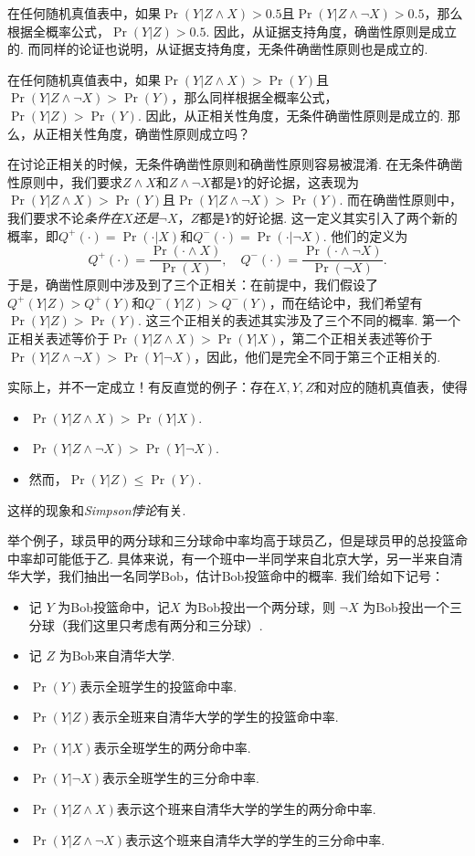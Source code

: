 在任何随机真值表中，如果$\Pr(Y|Z\wedge X)>0.5$且$\Pr(Y|Z\wedge\neg X)>0.5$，那么根据全概率公式，$\Pr(Y|Z)>0.5$. 因此，从证据支持角度，确凿性原则是成立的. 而同样的论证也说明，从证据支持角度，无条件确凿性原则也是成立的.

在任何随机真值表中，如果$\Pr(Y|Z\wedge X)>\Pr(Y)$且$\Pr(Y|Z\wedge\neg X)>\Pr(Y)$，那么同样根据全概率公式，$\Pr(Y|Z)>\Pr(Y)$. 因此，从正相关性角度，无条件确凿性原则是成立的. 那么，从正相关性角度，确凿性原则成立吗？

\begin{remark}
    在讨论正相关的时候，无条件确凿性原则和确凿性原则容易被混淆. 在无条件确凿性原则中，我们要求$Z\wedge X$和$Z\wedge\neg X$都是$Y$的好论据，这表现为$\Pr(Y|Z\wedge X)>\Pr(Y)$且$\Pr(Y|Z\wedge\neg X)>\Pr(Y)$. 而在确凿性原则中，我们要求不论\emph{条件在$X$还是$\neg X$}，$Z$都是$Y$的好论据. 这一定义其实引入了两个新的概率，即$Q^+(\cdot)=\Pr(\cdot|X)$和$Q^-(\cdot)=\Pr(\cdot|\neg X)$. 他们的定义为
    \[
    Q^+(\cdot)=\frac{\Pr(\cdot\wedge X)}{\Pr(X)},\quad Q^-(\cdot)=\frac{\Pr(\cdot\wedge \neg X)}{\Pr(\neg X)}.
    \]
    于是，确凿性原则中涉及到了三个正相关：在前提中，我们假设了$Q^+(Y|Z)>Q^+(Y)$和$Q^-(Y|Z)>Q^-(Y)$，而在结论中，我们希望有$\Pr(Y|Z)>\Pr(Y)$. 这三个正相关的表述其实涉及了三个不同的概率. 第一个正相关表述等价于$\Pr(Y|Z\wedge X)>\Pr(Y|X)$，第二个正相关表述等价于$\Pr(Y|Z\wedge\neg X)>\Pr(Y|\neg X)$，因此，他们是完全不同于第三个正相关的.
\end{remark}

实际上，并不一定成立！有反直觉的例子：存在$X, Y, Z$和对应的随机真值表，使得
    \begin{itemize}
        \item $\Pr(Y| Z\wedge X)>\Pr(Y|X)$.
        \item $\Pr(Y| Z \wedge \neg X)>\Pr(Y|\neg X)$.
        \item 然而，$\Pr(Y|Z)\le \Pr(Y)$.
    \end{itemize}
这样的现象和\emph{Simpson悖论}有关. 

举个例子，球员甲的两分球和三分球命中率均高于球员乙，但是球员甲的总投篮命中率却可能低于乙. 具体来说，有一个班中一半同学来自北京大学，另一半来自清华大学，我们抽出一名同学Bob，估计Bob投篮命中的概率. 我们给如下记号：

\begin{itemize}
    \item 记 $Y$ 为Bob投篮命中，记$X$ 为Bob投出一个两分球，则 $\neg X$ 为Bob投出一个三分球（我们这里只考虑有两分和三分球）.
    \item 记 $Z$ 为Bob来自清华大学.
    \item $\Pr(Y)$表示全班学生的投篮命中率.
    \item $\Pr(Y|Z)$表示全班来自清华大学的学生的投篮命中率.
    \item $\Pr(Y|X)$表示全班学生的两分命中率.
    \item $\Pr(Y|\neg X)$表示全班学生的三分命中率.
    \item $\Pr(Y|Z \wedge X)$表示这个班来自清华大学的学生的两分命中率.
    \item $\Pr(Y|Z \wedge \neg X)$表示这个班来自清华大学的学生的三分命中率.
\end{itemize}

